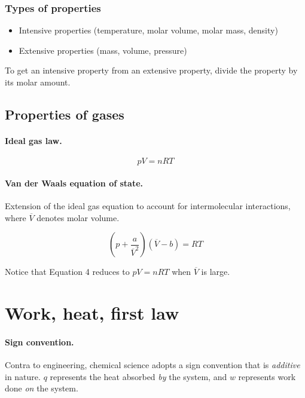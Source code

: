\documentclass{article}
\numberwithin{theorem}{section}
\numberwithin{corollary}{section}
\numberwithin{postulate}{section}
\numberwithin{lemma}{section}
\numberwithin{definition}{section}
\begin{document}
\subsubsection{Types of properties}
\begin{itemize}
  \item{Intensive properties (temperature, molar volume, molar mass, density)}
  \item{Extensive properties (mass, volume, pressure)}
\end{itemize}

To get an intensive property from an extensive property, divide the property by
its molar amount.

\subsection{Properties of gases}

\paragraph{Ideal gas law. }
\begin{equation}
  pV = nRT
\end{equation}

\paragraph{Van der Waals equation of state.} Extension of the ideal gas equation
to account for intermolecular interactions, where $\overline{V}$ denotes molar
volume. 

\begin{equation}
  \left( p + \frac{a}{\overline{V}^2} \right) (\overline{V} - b) = RT 
\end{equation}

Notice that Equation 4 reduces to $pV = nRT$ when $\overline{V}$ is large.

\section{Work, heat, first law}

\paragraph{Sign convention. }Contra to engineering, chemical science adopts
a sign convention that is \textit{additive} in nature. $q$ represents the heat
absorbed \textit{by} the system, and $w$ represents work done \textit{on} the
system.
\end{document}
